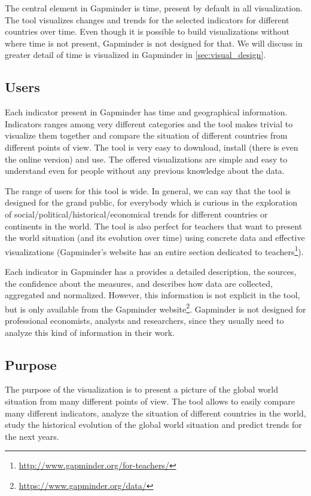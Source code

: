 The central element in Gapminder is time, present by default in all visualization.
The tool visualizes changes and trends for the selected indicators for different countries over time.
Even though it is possible to build visualizations without where time is not present, Gapminder is not designed for that.
We will discuss in greater detail of time is visualized in Gapminder in \cref{sec:visual_design}.

\subsection{Users}
Each indicator present in Gapminder has time and geographical information.
Indicators ranges among very different categories and the tool makes trivial to visualize them together and compare the situation of different countries from different points of view.
The tool is very easy to download, install (there is even the online version) and use.
The offered visualizations are simple and easy to understand even for people without any previous knowledge about the data.

The range of users for this tool is wide.
In general, we can say that the tool is designed for the grand public, for everybody which is curious in the exploration of social/political/historical/economical trends for different countries or continents in the world.
The tool is also perfect for teachers that want to present the world situation (and its evolution over time) using concrete data and effective visualizations 
(Gapminder's website has an entire section dedicated to teachers\footnote{\url{http://www.gapminder.org/for-teachers/}}).

Each indicator in Gapminder has a provides a detailed description, the sources, the confidence about the measures, and describes how data are collected, aggregated and normalized.
However, this information is not explicit in the tool, but is only available from the Gapminder website\footnote{\url{https://www.gapminder.org/data/}}.
Gapminder is not designed for professional economists, analysts and researchers, since they usually need to analyze this kind of information in their work.


\subsection{Purpose}
The purpose of the visualization is to present a picture of the global world situation from many different points of view.
The tool allows to easily compare many different indicators, analyze the situation of different countries in the world, study the historical evolution of the global world situation and predict trends for the next years.

